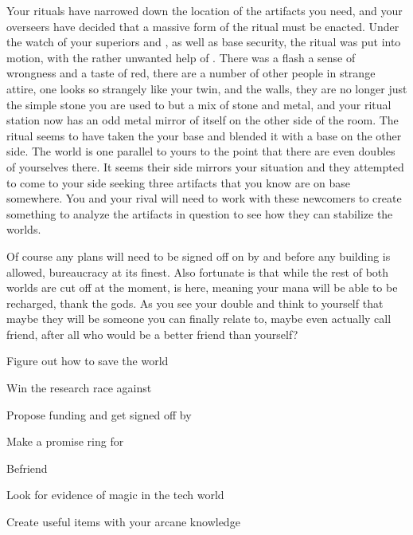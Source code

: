 \documentclass[char]{guildcamp3}
\begin{document}
Your rituals have narrowed down the location of the artifacts you need, and your overseers have decided that a massive form of the ritual must be enacted. Under the watch of your superiors \cNobleOne{\intro} and \cNobleTwo{\intro}, as well as base security, the ritual was put into motion, with the rather unwanted help of \cMageTwo{}. There was a flash a sense of wrongness and a taste of red, there are a number of other people in strange attire, one looks so strangely like your twin, and the walls, they are no longer just the simple stone you are used to but a mix of stone and metal, and your ritual station now has an odd metal mirror of itself on the other side of the room. The ritual seems to have taken the your base and blended it with a base on the other side. The world is one parallel to yours to the point that there are even doubles of yourselves there. It seems their side mirrors your situation and they attempted to come to your side seeking three artifacts that you know are on base somewhere. You and your rival will need to work with these newcomers to create something to analyze the artifacts in question to see how they can stabilize the worlds. 

Of course any plans will need to be signed off on by \cNobleOne{\intro} and \cNobleTwo{\intro} before any building is allowed, bureaucracy at its finest. Also fortunate is that while the rest of both worlds are cut off at the moment, \cPaladin{} is here, meaning your mana will be able to be recharged, thank the gods. As you see your double and think to yourself that maybe they will be someone you can finally relate to, maybe even actually call friend, after all who would be a better friend than yourself? 

\begin{itemz}[Goals]
  \item Figure out how to save the world
  \item Win the research race against \cMageTwo{}
  \item Propose funding and get signed off by \cNobleTwo{}
  \item Make a promise ring for \cNobleOne{} 
  \item Befriend \cSciTwo{}
  \item Look for evidence of magic in the tech world
  \item Create useful items with your arcane knowledge
\end{itemz}
%
\end{document}
